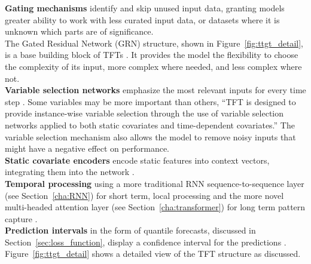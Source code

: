     
    \noindent\textbf{Gating mechanisms} identify and skip unused input data, granting models greater ability to work with less curated input data, or datasets where it is unknown which parts are of significance.\\
    The Gated Residual Network (GRN) structure, shown in Figure~\ref{fig:ttgt_detail}, is a base building block of TFTs \cite{lim_temporal_2020}. It provides the model the flexibility to choose the complexity of its input, more complex where needed, and less complex where not.\\
    \clearpage
    \noindent\textbf{Variable selection networks} emphasize the most relevant inputs for every time step \cite{lim_temporal_2020}. Some variables may be more important than others, \enquote{TFT is designed to provide instance-wise variable selection through the use of variable selection networks applied to both static covariates and time-dependent covariates.} \cite{lim_temporal_2020} The variable selection mechanism also allows the model to remove noisy inputs that might have a negative effect on performance. \\
    \textbf{Static covariate encoders} encode static features into context vectors, integrating them into the network \cite{lim_temporal_2020}.  \\
    \textbf{Temporal processing} using a more traditional RNN sequence-to-sequence layer (see Section~\ref{cha:RNN}) for short term, local processing and the more novel multi-headed attention layer (see Section~\ref{cha:transformer}) for long term pattern capture \cite{lim_temporal_2020}.\\
    \textbf{Prediction intervals} in the form of quantile forecasts, discussed in Section~\ref{sec:loss_function}, display a confidence interval for the predictions \cite{lim_temporal_2020}. \\
    Figure~\ref{fig:ttgt_detail} shows a detailed view of the TFT structure as discussed. 
    

